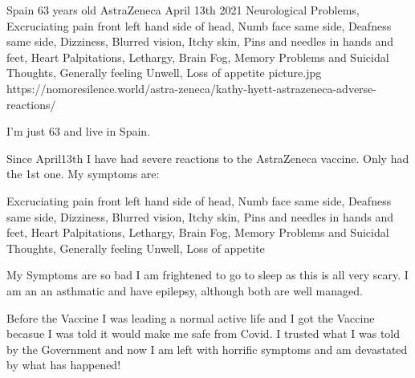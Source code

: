 {Spain}
{63 years old}
{AstraZeneca}
{April 13th 2021}
{ Neurological Problems, Excruciating pain front left hand side of head, Numb
    face same side, Deafness same side, Dizziness, Blurred vision, Itchy skin,
    Pins and needles in hands and feet, Heart Palpitations, Lethargy, Brain Fog,
    Memory Problems and Suicidal Thoughts, Generally feeling Unwell, Loss of
    appetite }
{picture.jpg}
{https://nomoresilence.world/astra-zeneca/kathy-hyett-astrazeneca-adverse-reactions/}
{

I’m just 63 and live in Spain.

Since April13th I have had severe reactions to the AstraZeneca vaccine. Only had
the 1st one. My symptoms are:

Excruciating pain front left hand side of head, Numb face same side, Deafness
same side, Dizziness, Blurred vision, Itchy skin, Pins and needles in hands and
feet, Heart Palpitations, Lethargy, Brain Fog, Memory Problems and Suicidal
Thoughts, Generally feeling Unwell, Loss of appetite

My Symptoms are so bad I am frightened to go to sleep as this is all very scary. I am an an asthmatic and have epilepsy, although both are well managed.

Before the Vaccine I was leading a normal active life and I got the Vaccine becasue I was told it would make me safe from Covid. I trusted what I was told by the Government and now I am left with horrific symptoms and am devastated by what has happened!
}
